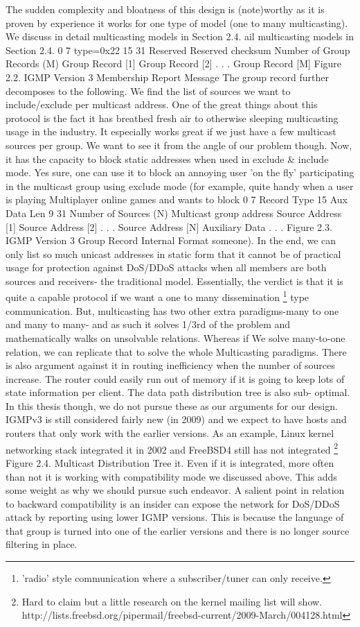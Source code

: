 \documentclass[11pt,left=2cm,bottom=2cm,oneside]{book}
\begin{document}
The sudden complexity and bloatness of this design is (note)worthy as it is proven by
experience it works for one type of model (one to many multicasting). We
discuss
in detail multicasting models in Section 2.4.
ail multicasting models in Section 2.4.
0
7
type=0x22
15
31
Reserved
Reserved
checksum
Number of Group Records (M)
Group Record [1]
Group Record [2]
.
.
.
Group Record [M]
Figure 2.2. IGMP Version 3 Membership Report Message
The group record further decomposes to the following. We find the list of
sources we want to include/exclude per multicast address.
One of the great things about this protocol is the fact it has breathed fresh
air
to otherwise sleeping multicasting usage in the industry. It especially works
great
if we just have a few multicast sources per group. We want to see it from the
angle
of our problem though. Now, it has the capacity to block static addresses when
used in exclude \& include mode. Yes sure, one can use it to block an annoying
user
'on the fly' participating in the multicast group using exclude mode (for
example,
quite handy when a user is playing Multiplayer online games and wants to block
0
7
Record Type
15
Aux Data Len
9
31
Number of Sources (N)
Multicast group address
Source Address [1]
Source Address [2]
.
.
.
Source Address [N]
Auxiliary Data
.
.
.
Figure 2.3. IGMP Version 3 Group Record Internal Format
someone). In the end, we can only list so much unicast addresses in static
form
that it cannot be of practical usage for protection against DoS/DDoS attacks
when
all members are both sources and receivers- the traditional model.
Essentially, the
verdict is that it is quite a capable protocol if we want a one to many
dissemination
\footnote{'radio' style communication where a subscriber/tuner can only receive.}
type communication. But, multicasting has two other extra paradigms-many to
one and many to many- and as such it solves 1/3rd of the problem and mathematically walks on unsolvable relations. Whereas if We solve many-to-one relation, we can replicate that to solve the whole Multicasting paradigms.
There is also argument against it in routing inefficiency when the number of
sources increase. The router could easily run out of memory if it is going to
keep
lots of state information per client. The data path distribution tree is also
sub-
optimal. In this thesis though, we do not pursue these as our arguments for
our
design. IGMPv3 is still considered fairly new (in 2009) and we expect to have
hosts and routers that only work with the earlier versions. As an example,
Linux
kernel networking stack integrated it in 2002 and FreeBSD4 still has not
integrated
\footnote{Hard to claim but a little research on the kernel mailing list will show.
http://lists.freebsd.org/pipermail/freebsd-current/2009-March/004128.html}
Figure 2.4. Multicast Distribution Tree
it. Even if it is integrated, more often than not it is working with
compatibility
mode we discussed above. This adds some weight as why we should pursue such
endeavor.
A salient point in relation to backward compatibility is an insider can expose
the network for DoS/DDoS attack by reporting using lower IGMP versions. This
is because the language of that group is turned into one of the earlier
versions and
there is no longer source filtering in place.
\end{document}
